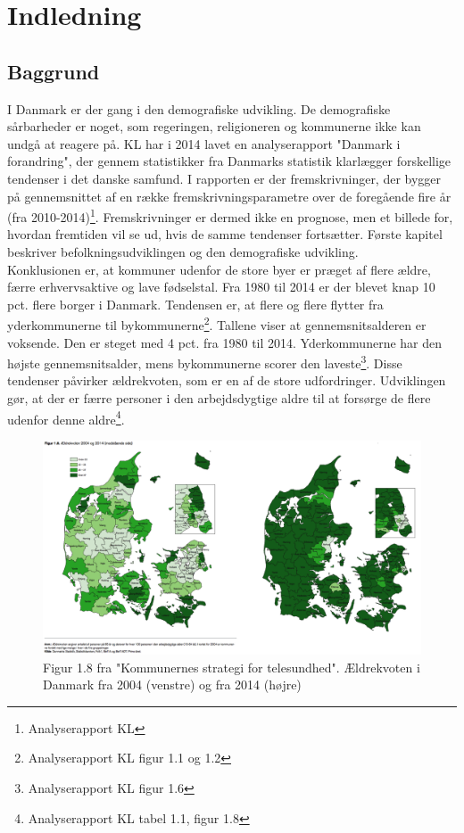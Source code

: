 \chapter{Indledning}

\section{Baggrund}
I Danmark er der gang i den demografiske udvikling. De demografiske sårbarheder er noget, som regeringen, religioneren og kommunerne ikke kan undgå at reagere på. KL har i 2014 lavet en analyserapport "Danmark i forandring", der gennem statistikker fra Danmarks statistik klarlægger forskellige tendenser i det danske samfund. I rapporten er der fremskrivninger, der bygger på gennemsnittet af en række fremskrivningsparametre over de foregående fire år (fra 2010-2014)\footnote{Analyserapport KL}. Fremskrivninger er dermed ikke en prognose, men et billede for, hvordan fremtiden vil se ud, hvis de samme tendenser fortsætter. Første kapitel beskriver befolkningsudviklingen og den demografiske udvikling. \\
Konklusionen er, at kommuner udenfor de store byer er præget af flere ældre, færre erhvervsaktive og lave fødselstal. Fra 1980 til 2014 er der blevet knap 10 pct. flere borger i Danmark. Tendensen er, at flere og flere flytter fra yderkommunerne til bykommunerne\footnote{Analyserapport KL figur 1.1 og 1.2 }. Tallene viser at gennemsnitsalderen er voksende. Den er steget med 4 pct. fra 1980 til 2014. Yderkommunerne har den højste gennemsnitsalder, mens bykommunerne scorer den laveste\footnote{Analyserapport KL figur 1.6}. Disse tendenser påvirker ældrekvoten, som er en af de store udfordringer. Udviklingen gør, at der er færre personer i den arbejdsdygtige aldre til at forsørge de flere udenfor denne aldre\footnote{Analyserapport KL tabel 1.1, figur 1.8}.

\begin{figure}[H]
\centering
\includegraphics[width=1\textwidth]{Figurer/Snip20160428_14}
\caption{Figur 1.8 fra "Kommunernes strategi for telesundhed". Ældrekvoten i Danmark fra 2004 (venstre) og fra 2014 (højre)}
	
\end{figure}

